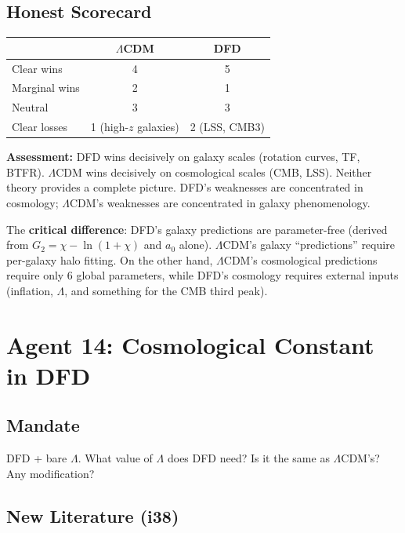 \documentclass[11pt,a4paper]{article}
\begin{document}
\subsection{Honest Scorecard}

\begin{center}
\begin{tabular}{lcc}
\toprule
& \textbf{$\Lambda$CDM} & \textbf{DFD} \\
\midrule
Clear wins & 4 & 5 \\
Marginal wins & 2 & 1 \\
Neutral & 3 & 3 \\
Clear losses & 1 (high-$z$ galaxies) & 2 (LSS, CMB3) \\
\bottomrule
\end{tabular}
\end{center}

\textbf{Assessment:} DFD wins decisively on galaxy scales (rotation curves, TF, BTFR). $\Lambda$CDM wins decisively on cosmological scales (CMB, LSS). Neither theory provides a complete picture. DFD's weaknesses are concentrated in cosmology; $\Lambda$CDM's weaknesses are concentrated in galaxy phenomenology.

The \textbf{critical difference}: DFD's galaxy predictions are parameter-free (derived from $G_2 = \chi - \ln(1+\chi)$ and $a_0$ alone). $\Lambda$CDM's galaxy ``predictions'' require per-galaxy halo fitting. On the other hand, $\Lambda$CDM's cosmological predictions require only 6 global parameters, while DFD's cosmology requires external inputs (inflation, $\Lambda$, and something for the CMB third peak).


\newpage
\section{Agent 14: Cosmological Constant in DFD}
\label{sec:agent14}

\subsection{Mandate}

DFD + bare $\Lambda$. What value of $\Lambda$ does DFD need? Is it the same as $\Lambda$CDM's? Any modification?

\subsection{New Literature (i38)}
\end{document}
